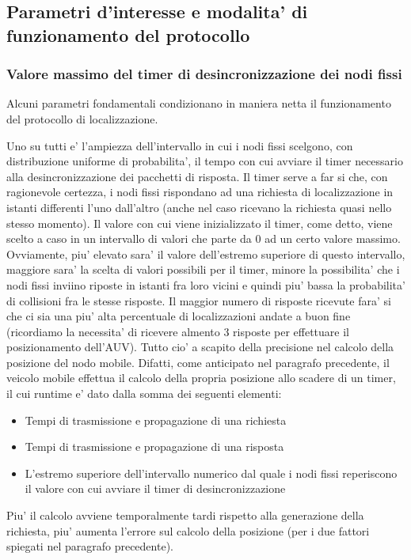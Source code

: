 \documentclass[Lau,binding=0.6cm]{sapthesis}
\begin{document}
\subsection{Parametri d'interesse e modalita' di funzionamento del protocollo}
\subsubsection{Valore massimo del timer di desincronizzazione dei nodi fissi}
Alcuni parametri fondamentali condizionano in maniera netta il funzionamento del protocollo di localizzazione.\par Uno su tutti e' l'ampiezza dell'intervallo
in cui i nodi fissi scelgono, con distribuzione uniforme di probabilita', il tempo con cui avviare il timer necessario alla desincronizzazione dei pacchetti di risposta.
Il timer serve a far si che, con ragionevole certezza, i nodi fissi rispondano ad una richiesta di localizzazione in istanti differenti l'uno dall'altro (anche nel caso ricevano la richiesta quasi nello stesso momento).
Il valore con cui viene inizializzato il timer, come detto, viene scelto a caso in un intervallo di valori che parte da 0 ad un certo valore massimo.
Ovviamente, piu' elevato sara' il valore dell'estremo superiore di questo intervallo, maggiore sara' la scelta di valori possibili per il timer, minore la possibilita' che i nodi fissi inviino riposte in istanti fra loro vicini e quindi
piu' bassa la probabilita' di collisioni fra le stesse risposte. Il maggior numero di risposte ricevute fara' si che ci sia una piu' alta percentuale di localizzazioni andate a buon fine (ricordiamo la necessita' di ricevere almento 3 risposte per effettuare il posizionamento dell'AUV).\newline
Tutto cio' a scapito della precisione nel calcolo della posizione del nodo mobile. Difatti, come anticipato nel paragrafo precedente, il veicolo mobile effettua il calcolo della propria posizione allo scadere di un timer, il cui runtime e' dato dalla somma dei seguenti elementi:
\begin{itemize}
    \item Tempi di  trasmissione e propagazione di una richiesta
    \item Tempi di  trasmissione e propagazione di una risposta
    \item L'estremo superiore dell'intervallo numerico dal quale i nodi fissi reperiscono il valore con cui avviare il timer di desincronizzazione
\end{itemize}
Piu' il calcolo avviene temporalmente tardi rispetto alla generazione della richiesta, piu' aumenta l'errore sul calcolo della posizione (per i due fattori spiegati nel paragrafo precedente).
\end{document}
